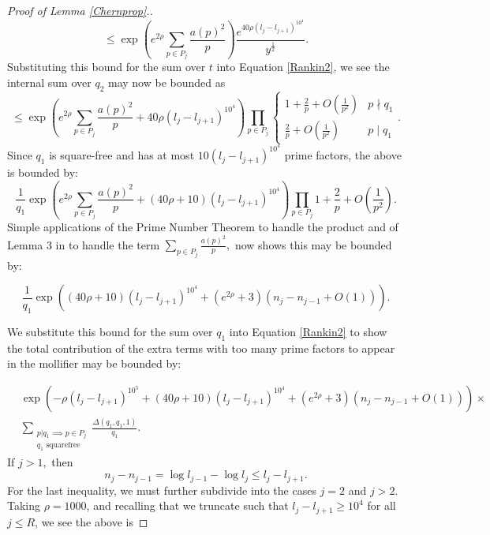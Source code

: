 \documentclass[12pt]{amsart}
\numberwithin{equation}{section}
\numberwithin{thm}{section}
\newcommand{\1}{\mathbf 1}
\begin{document}
\begin{proof}[Proof of Lemma \ref{Chernprop}.]
\begin{equation}\label{psibound}
	\le 		\exp\left(e^{2\rho}\sum_{p\in P_{j}} \frac{a(p)^2}{p}\right)\frac{e^{40\rho(l_j-l_{j+1})^{10^4}}}{y^{\frac{1}{2}}}.
\end{equation}		
		Substituting this bound for the sum over $t$ into Equation \eqref{Rankin2}, we see the internal sum over $q_2$ may now be bounded as
\begin{equation}\le \exp\left(e^{2\rho}\sum_{p\in P_{j}} \frac{a(p)^2}{p}+40\rho(l_j-l_{j+1})^{10^4}\right)\prod_{p\in P_{j}} \begin{cases}
		1+\frac{2}{p}+O\left(\frac{1}{p^2}\right)& p\nmid q_1\\
		\frac{2}{p}+O\left(\frac{1}{p^2}\right)& p\mid q_1
	\end{cases}.\end{equation}
Since $q_1$ is square-free and has at most $10(l_j-l_{j+1})^{10^4}$ prime factors, the above is bounded by:
\begin{equation}
	\frac{1}{q_1} \exp\left(e^{2\rho}\sum_{p\in P_{j}} \frac{a(p)^2}{p}+(40\rho+10)(l_j-l_{j+1})^{10^4}\right)\prod_{p\in P_{j}}1+\frac{2}{p}+O\left(\frac{1}{p^2}\right). 
\end{equation}	
Simple applications of the Prime Number Theorem to handle the product and of Lemma 3 in \cite{RS2} to handle the term $\sum_{p\in P_{j}} \frac{a(p)^2}{p},$ now shows this may be bounded by:

\begin{equation}
	\frac{1}{q_1} \exp\left((40\rho+10)(l_j-l_{j+1})^{10^4}+(e^{2\rho}+3)(n_j-n_{j-1}+O(1))\right). 
\end{equation}



We substitute this bound for the sum over $q_1$ into Equation \eqref{Rankin2} to show the total contribution of the extra terms with too many prime factors to appear in the mollifier may be bounded by:


\begin{align}&\exp\left(-\rho(l_j-l_{j+1})^{10^5}+(40\rho+10)(l_j-l_{j+1})^{10^4}+(e^{2\rho}+3)(n_j-n_{j-1}+O(1))\right)\times\nonumber\\ &\label{casesplitchern}\sum_{\substack{p|q_1\implies p\in P_{j}\\ q_1\text{  squarefree}}}\frac{\Delta(q_1,q_1,1)}{q_1}.\end{align}
If $j>1,$ then \begin{equation}
n_j-n_{j-1}=\log l_{j-1}-\log l_j\le l_{j}-l_{j+1}.\end{equation} For the last inequality, we must further subdivide into the cases $j=2$ and $j>2$.
 Taking $\rho=1000$, and recalling that we truncate such that $l_j-l_{j+1}\ge 10^4$ for all $j\le R$, we see the above is


\end{proof}
\end{document}
